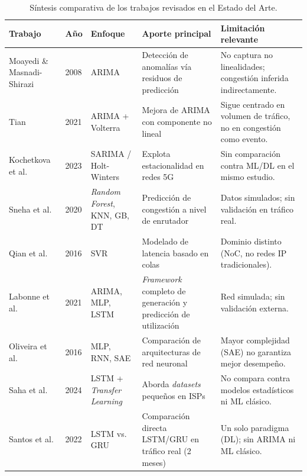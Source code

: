 \documentclass[12pt]{report}
\begin{document}
\begin{table}[H]
    \centering
    \small
    \begin{tabular}{|p{2.6cm}|p{1.6cm}|p{2.6cm}|p{3cm}|p{3.4cm}|}
        \hline
        \textbf{Trabajo} & \textbf{Año} & \textbf{Enfoque} & \textbf{Aporte principal} & \textbf{Limitación relevante} \\
        \hline
        Moayedi \& Masnadi-Shirazi \cite{moayedi2008} & 2008 & ARIMA & Detección de anomalías vía residuos de predicción & No captura no linealidades; congestión inferida indirectamente. \\
        \hline
        Tian \cite{tian2021} & 2021 & ARIMA + Volterra & Mejora de ARIMA con componente no lineal & Sigue centrado en volumen de tráfico, no en congestión como evento. \\
        \hline
        Kochetkova et al. \cite{kochetkova2023} & 2023 & SARIMA / Holt-Winters & Explota estacionalidad en redes 5G & Sin comparación contra ML/DL en el mismo estudio. \\
        \hline
        Sneha et al. \cite{sneha2020} & 2020 & \textit{Random Forest}, KNN, GB, DT & Predicción de congestión a nivel de enrutador & Datos simulados; sin validación en tráfico real. \\
        \hline
        Qian et al. \cite{qian2016} & 2016 & SVR & Modelado de latencia basado en colas & Dominio distinto (NoC, no redes IP tradicionales). \\
        \hline
        Labonne et al. \cite{labonne2021} & 2021 & ARIMA, MLP, LSTM & \textit{Framework} completo de generación y predicción de utilización & Red simulada; sin validación externa. \\
        \hline
        Oliveira et al. \cite{oliveira2016} & 2016 & MLP, RNN, SAE & Comparación de arquitecturas de red neuronal & Mayor complejidad (SAE) no garantiza mejor desempeño. \\
        \hline
        Saha et al. \cite{saha2024} & 2024 & LSTM + \textit{Transfer Learning} & Aborda \textit{datasets} pequeños en ISPs & No compara contra modelos estadísticos ni ML clásico. \\
        \hline
        Santos et al. \cite{santos2022} & 2022 & LSTM vs. GRU & Comparación directa LSTM/GRU en tráfico real (2 meses) & Un solo paradigma (DL); sin ARIMA ni ML clásico. \\
        \hline
    \end{tabular}
    \caption{Síntesis comparativa de los trabajos revisados en el Estado del Arte.}
    \label{tab:sintesis_maestra}
\end{table}
\end{document}
